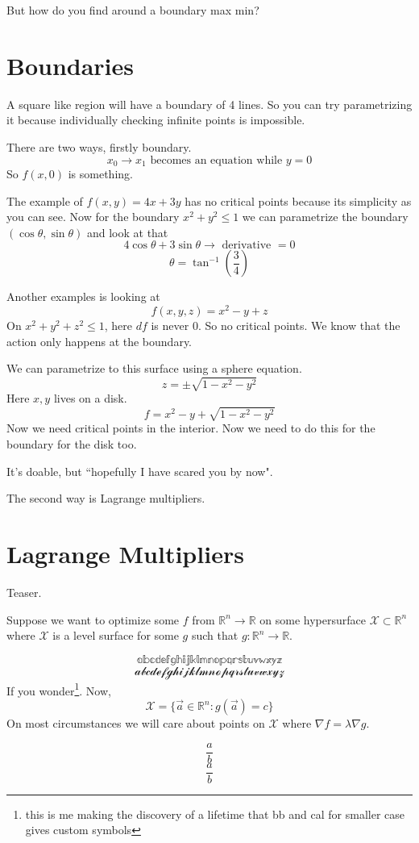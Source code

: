 \documentclass[letter]{article}
\begin{document}
But how do you find around a boundary max min? 

\section*{Boundaries}
A square like region will have a boundary of 4 lines. So you can try parametrizing it because individually checking infinite points is impossible. 

There are two ways, firstly boundary. 
\[
	x_0 \to  x_1 \text{ becomes an equation while } y = 0
\]
So $f(x,0)$ is something.

The example of $f(x,y) = 4x + 3y$ has no critical points because its simplicity as you can see. Now for the boundary $x^2 + y^2 \le 1$ we can parametrize the boundary $(\cos \theta, \sin \theta)$ and look at that
\[
4 \cos \theta + 3 \sin \theta \to \text{ derivative } = 0 
\]
\[
\theta = \tan ^{-1} \left(\frac{3}{4}\right)
\]

Another examples is looking at 
\[
f(x,y,z) = x^2 - y + z
\] 
On $x^2 + y^2 + z^2 \le  1$, here $d f $ is never $0$. So no critical points. We know that the action only happens at the boundary. 

We can parametrize to this surface using a sphere equation. 
\[
z = \pm \sqrt{1 - x^2 - y^2} 
\] 
Here $x,y$ lives on a disk. 
\[
f = x^2 - y + \sqrt{1 - x^2 - y^2} 
\]
Now we need critical points in the interior. Now we need to do this for the boundary for the disk too. 

It's doable, but ``hopefully I have scared you by now". 

The second way is Lagrange multipliers. 

\section*{Lagrange Multipliers}
Teaser. 

Suppose we want to optimize some $f$ from $\mathbb{R}^{n} \to \mathbb{R}$ on some hypersurface $\mathcal X \subset \mathbb{R}^{n}$ where $\mathcal X$ is a level surface for some $g$ such that $g : \mathbb{R}^{n} \to \mathbb{R}$. 

$$
\mathbb{abcdefghijklmnopqrstuvwxyz} $$ $$ 
\mathcal{abcdefghijklmnopqrstuvwxyz}
$$
If you wonder\footnote{this is me making the discovery of a lifetime that bb and cal for smaller case gives custom symbols}.
Now, 
\[
\mathcal X = \{\vec{a} \in  \mathbb{R}^{n}: g(\vec{a}) = c\} 
\]
On most circumstances we will care about points on $\mathcal X$ where $\nabla f = \lambda \nabla g$. 

\[
\frac{a}{b}
\] 
\[
\frac{a}{b}
\] 
\end{document}
